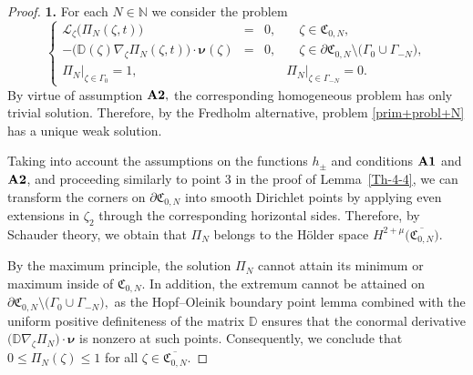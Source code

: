 \documentclass[reqno]{amsart}            %
\numberwithin{equation}{section}
\begin{document}
	
	\begin{proof}{\bf 1.} For each $N \in \mathbb{N}$ we consider the problem 
		\begin{equation}\label{prim+probl+N}
			\left\{\begin{array}{rcll}
				\mathcal{L}_{\zeta}\big(\Pi_{N}(\zeta,t)\big)
				& =    & 0,
				& \quad \zeta\in \mathfrak{C}_{0,N},
				\\[2mm]
				-\big(\mathbb{D}(\zeta)\nabla_{\zeta}\Pi_{N}(\zeta,t)\big) \cdot \boldsymbol{\nu}(\zeta) & =
				& 0,
				& \quad \zeta\in \partial\mathfrak{C}_{0,N} \setminus \big(\Gamma_0 \cup \Gamma_{-N}\big),
				\\[2mm]
				\Pi_{N}\big|_{\zeta\in \Gamma_0} = 1, & & &\Pi_{N}\big|_{\zeta\in \Gamma_{-N}} = 0.  
			\end{array}\right.
		\end{equation}
		By virtue of assumption ${\bf A2},$ the corresponding homogeneous problem has only trivial solution. Therefore, by the Fredholm alternative, problem \eqref{prim+probl+N} has a unique weak solution. 
		
		Taking into account the assumptions on the functions $h_\pm$ and conditions ${\bf A1}$ and ${\bf A2}$, and proceeding similarly to point 3 in  the proof of Lemma~\ref{Th-4-4}, we can transform the corners on $\partial\mathfrak{C}_{0,N}$ into smooth Dirichlet points by applying even extensions in $\zeta_2$ through the corresponding horizontal sides.  Therefore, by Schauder theory, we obtain that $\Pi_N$ belongs to the H\"older space $H^{2+\mu}\big(\overline{\mathfrak{C}_{0,N}}\big).$ 
		
		By the maximum principle, the solution $\Pi_N$ cannot attain its minimum or maximum inside of $\mathfrak{C}_{0,N}.$ 
		In addition, the extremum cannot be attained on $\partial\mathfrak{C}_{0,N} \setminus \big(\Gamma_0 \cup \Gamma_{-N}\big),$ as the Hopf–Oleinik boundary point lemma combined with the uniform positive definiteness of the matrix $\mathbb{D}$ ensures that the conormal derivative $\big(\mathbb{D}\nabla_{\zeta}\Pi_{N}\big) \cdot \boldsymbol{\nu}$ is nonzero at such points.
		Consequently, we conclude that $0 \le \Pi_N(\zeta) \le 1$ for all $\zeta \in \overline{\mathfrak{C}_{0,N}}.$ 
		
		
		\smallskip
		

\end{proof}
\end{document}
